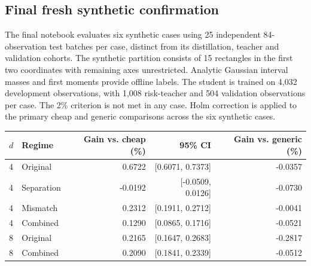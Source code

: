 \documentclass[10pt,letterpaper]{article}
\begin{document}
\subsection{Final fresh synthetic confirmation}
The final notebook evaluates six synthetic cases using 25 independent 84-observation test batches per case, distinct from its distillation, teacher and validation cohorts. The synthetic partition consists of 15 rectangles in the first two coordinates with remaining axes unrestricted. Analytic Gaussian interval masses and first moments provide offline labels. The student is trained on 4,032 development observations, with 1,008 risk-teacher and 504 validation observations per case. The 2\% criterion is not met in any case. Holm correction is applied to the primary cheap and generic comparisons across the six synthetic cases.
\begin{center}\begin{minipage}{\linewidth}\centering\small
\begin{tabular}{@{}llrrr@{}}\toprule
$d$ & Regime & Gain vs. cheap (\%) & 95\% CI & Gain vs. generic (\%)\\\midrule
4 & Original & 0.6722 & [0.6071, 0.7373] & -0.0357\\
4 & Separation & -0.0192 & [-0.0509, 0.0126] & -0.0730\\
4 & Mismatch & 0.2312 & [0.1911, 0.2712] & -0.0041\\
4 & Combined & 0.1290 & [0.0865, 0.1716] & -0.0521\\
8 & Original & 0.2165 & [0.1647, 0.2683] & -0.2817\\
8 & Combined & 0.2090 & [0.1841, 0.2339] & -0.0512\\\bottomrule
\end{tabular}\end{minipage}\end{center}
\end{document}
